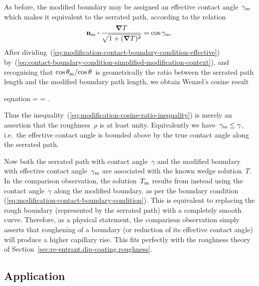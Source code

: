 As before, the modified boundary may be assigned
an effective contact angle~$\gamma_{\mathrm{m}}$
which makes it equivalent to the serrated path,
according to the relation
\begin{equation}
  \mathop{}\!\boldsymbol{\mathbf{n}}_{\mathrm{m}} \boldsymbol{\cdot} \frac{\mathop{}\!\boldsymbol{\mathbf{\nabla}} T}{\sqrt{1 + (\mathop{}\!\boldsymbol{\mathbf{\nabla}} T)^2}}
    = \cos\gamma_{\mathrm{m}}.
  \label{eq:modification-contact-boundary-condition-effective}
\end{equation}
After dividing~(\ref{eq:modification-contact-boundary-condition-effective})
by~(\ref{eq:contact-boundary-condition-simplified-modification-context}),
and recognising that $\cos\theta_{\mathrm{m}} / {\cos\theta}$~is geometrically
the ratio between the serrated path length
and the modified boundary path length,
we obtain Wenzel's cosine result
\begin{important}{equation}
  \rho
    = \frac{\cos\theta_\modi}{\cos\theta}
    = \frac{\cos\gamma_\modi}{\cos\gamma}.
  \label{eq:modification-roughness-cosine-ratio}
\end{important}
Thus the inequality~(\ref{eq:modification-cosine-ratio-inequality})
is merely an assertion that the roughness~$\rho$ is at least unity.
Equivalently we have~$\gamma_{\mathrm{m}} \le \gamma$,
i.e.~the effective contact angle is bounded above
by the true contact angle along the serrated path.

Now both the serrated path with contact angle~$\gamma$
and the modified boundary with effective contact angle~$\gamma_{\mathrm{m}}$
are associated with the known wedge solution~$T$.
In the comparison observation,
the solution~$T_{\mathrm{m}}$ results from instead using the contact angle~$\gamma$
along the modified boundary,
as per the boundary condition~%
  (\ref{eq:modification-contact-boundary-condition}).
This is equivalent to replacing the rough boundary
(represented by the serrated path)
with a completely smooth curve.
Therefore, as a physical statement,
the comparison observation simply asserts that
roughening of a boundary (or reduction of its effective contact angle)
will produce a higher capillary rise.
This fits perfectly with the roughness theory
of Section~\ref{sec:re-entrant.dip-coating.roughness}.

\subsection{Application}
\label{sec:small.modification.application}

